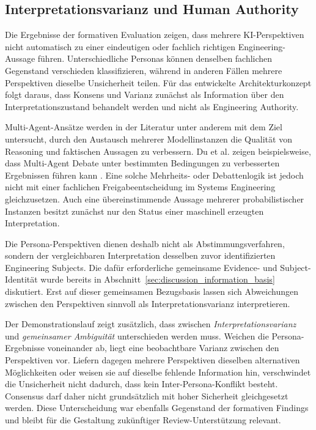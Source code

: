 \subsection{Interpretationsvarianz und Human Authority}
\label{sec:discussion_human_authority}

Die Ergebnisse der formativen Evaluation zeigen, dass mehrere
KI-Perspektiven nicht automatisch zu einer eindeutigen oder fachlich richtigen
Engineering-Aussage führen. Unterschiedliche Personas können denselben
fachlichen Gegenstand verschieden klassifizieren, während in anderen
Fällen mehrere Perspektiven dieselbe Unsicherheit teilen. Für das entwickelte
Architekturkonzept folgt daraus, dass Konsens und Varianz zunächst als
Information über den Interpretationszustand behandelt werden und nicht als
Engineering Authority.

Multi-Agent-Ansätze werden in der Literatur unter anderem mit dem Ziel
untersucht, durch den Austausch mehrerer Modellinstanzen die Qualität von
Reasoning und faktischen Aussagen zu verbessern. Du et al. zeigen
beispielsweise, dass Multi-Agent Debate unter bestimmten Bedingungen zu
verbesserten Ergebnissen führen kann \cite{Du2024}. Eine solche
Mehrheits- oder Debattenlogik ist jedoch nicht mit einer fachlichen
Freigabeentscheidung im Systems Engineering gleichzusetzen. Auch eine
übereinstimmende Aussage mehrerer probabilistischer Instanzen besitzt zunächst
nur den Status einer maschinell erzeugten Interpretation.

Die Persona-Perspektiven dienen deshalb nicht als Abstimmungsverfahren,
sondern der vergleichbaren Interpretation desselben zuvor identifizierten
Engineering Subjects. Die dafür erforderliche gemeinsame Evidence- und
Subject-Identität wurde bereits in
Abschnitt~\ref{sec:discussion_information_basis} diskutiert. Erst auf dieser
gemeinsamen Bezugsbasis lassen sich Abweichungen zwischen den Perspektiven
sinnvoll als Interpretationsvarianz interpretieren.

Der Demonstrationslauf zeigt zusätzlich, dass zwischen
\emph{Interpretationsvarianz} und \emph{gemeinsamer Ambiguität} unterschieden
werden muss. Weichen die Persona-Ergebnisse voneinander ab, liegt eine
beobachtbare Varianz zwischen den Perspektiven vor. Liefern dagegen mehrere
Perspektiven dieselben alternativen Möglichkeiten oder weisen sie auf dieselbe
fehlende Information hin, verschwindet die Unsicherheit nicht dadurch, dass
kein Inter-Persona-Konflikt besteht. Consensus darf daher nicht grundsätzlich
mit hoher Sicherheit gleichgesetzt werden. Diese Unterscheidung war ebenfalls
Gegenstand der formativen Findings und bleibt für die Gestaltung zukünftiger
Review-Unterstützung relevant.

